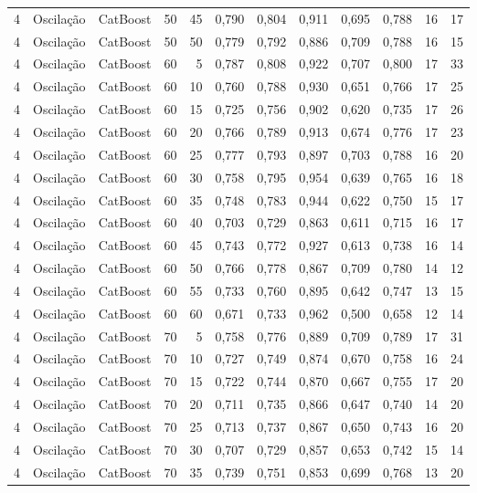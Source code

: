 \begin{longtable}{ccclrrrrrrrr}
4 & Oscilação & CatBoost & 50 & 45 & 0,790 & 0,804 & 0,911 & 0,695 & 0,788 & 16 & 17 \\
4 & Oscilação & CatBoost & 50 & 50 & 0,779 & 0,792 & 0,886 & 0,709 & 0,788 & 16 & 15 \\
4 & Oscilação & CatBoost & 60 & 5 & 0,787 & 0,808 & 0,922 & 0,707 & 0,800 & 17 & 33 \\
4 & Oscilação & CatBoost & 60 & 10 & 0,760 & 0,788 & 0,930 & 0,651 & 0,766 & 17 & 25 \\
4 & Oscilação & CatBoost & 60 & 15 & 0,725 & 0,756 & 0,902 & 0,620 & 0,735 & 17 & 26 \\
4 & Oscilação & CatBoost & 60 & 20 & 0,766 & 0,789 & 0,913 & 0,674 & 0,776 & 17 & 23 \\
4 & Oscilação & CatBoost & 60 & 25 & 0,777 & 0,793 & 0,897 & 0,703 & 0,788 & 16 & 20 \\
4 & Oscilação & CatBoost & 60 & 30 & 0,758 & 0,795 & 0,954 & 0,639 & 0,765 & 16 & 18 \\
4 & Oscilação & CatBoost & 60 & 35 & 0,748 & 0,783 & 0,944 & 0,622 & 0,750 & 15 & 17 \\
4 & Oscilação & CatBoost & 60 & 40 & 0,703 & 0,729 & 0,863 & 0,611 & 0,715 & 16 & 17 \\
4 & Oscilação & CatBoost & 60 & 45 & 0,743 & 0,772 & 0,927 & 0,613 & 0,738 & 16 & 14 \\
4 & Oscilação & CatBoost & 60 & 50 & 0,766 & 0,778 & 0,867 & 0,709 & 0,780 & 14 & 12 \\
4 & Oscilação & CatBoost & 60 & 55 & 0,733 & 0,760 & 0,895 & 0,642 & 0,747 & 13 & 15 \\
4 & Oscilação & CatBoost & 60 & 60 & 0,671 & 0,733 & 0,962 & 0,500 & 0,658 & 12 & 14 \\
4 & Oscilação & CatBoost & 70 & 5 & 0,758 & 0,776 & 0,889 & 0,709 & 0,789 & 17 & 31 \\
4 & Oscilação & CatBoost & 70 & 10 & 0,727 & 0,749 & 0,874 & 0,670 & 0,758 & 16 & 24 \\
4 & Oscilação & CatBoost & 70 & 15 & 0,722 & 0,744 & 0,870 & 0,667 & 0,755 & 17 & 20 \\
4 & Oscilação & CatBoost & 70 & 20 & 0,711 & 0,735 & 0,866 & 0,647 & 0,740 & 14 & 20 \\
4 & Oscilação & CatBoost & 70 & 25 & 0,713 & 0,737 & 0,867 & 0,650 & 0,743 & 16 & 20 \\
4 & Oscilação & CatBoost & 70 & 30 & 0,707 & 0,729 & 0,857 & 0,653 & 0,742 & 15 & 14 \\
4 & Oscilação & CatBoost & 70 & 35 & 0,739 & 0,751 & 0,853 & 0,699 & 0,768 & 13 & 20 \\

\end{longtable}

